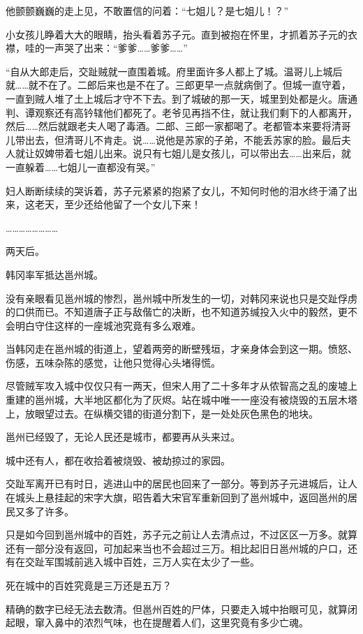 他颤颤巍巍的走上见，不敢置信的问着：“七姐儿？是七姐儿！？”

小女孩儿睁着大大的眼睛，抬头看着苏子元。直到被抱在怀里，才抓着苏子元的衣襟，哇的一声哭了出来：“爹爹……爹爹……”

“自从大郎走后，交趾贼就一直围着城。府里面许多人都上了城。温哥儿上城后就……就不在了。二郎后来也是不在了。三郎更早一点就病倒了。但城一直守着，一直到贼人堆了土上城后才守不下去。到了城破的那一天，城里到处都是火。唐通判、谭观察还有高钤辖他们都死了。老爷见再挡不住，就让我们剩下的人都离开，然后……然后就跟老夫人喝了毒酒。二郎、三郎一家都喝了。老都管本来要将清哥儿带出去，但清哥儿不肯走。说……说他是苏家的子弟，不能丢苏家的脸。最后夫人就让奴婢带着七姐儿出来。说只有七姐儿是女孩儿，可以带出去……出来后，就一直躲着……七姐儿一直都没有哭。”

妇人断断续续的哭诉着，苏子元紧紧的抱紧了女儿，不知何时他的泪水终于涌了出来，这老天，至少还给他留了一个女儿下来！

……………………

两天后。

韩冈率军抵达邕州城。

没有亲眼看见邕州城的惨烈，邕州城中所发生的一切，对韩冈来说也只是交趾俘虏的口供而已。不知道唐子正与敌偕亡的决断，也不知道苏缄投入火中的毅然，更不会明白守住这样的一座城池究竟有多么艰难。

当韩冈走在邕州城的街道上，望着两旁的断壁残垣，才亲身体会到这一期。愤怒、伤感，五味杂陈的感觉，让他只觉得心头堵得慌。

尽管贼军攻入城中仅仅只有一两天，但宋人用了二十多年才从侬智高之乱的废墟上重建的邕州城，大半地区都化为了灰烬。站在城中唯一一座没有被烧毁的五层木塔上，放眼望过去。在纵横交错的街道分割下，是一处处灰色黑色的地块。

邕州已经毁了，无论人民还是城市，都要再从头来过。

城中还有人，都在收拾着被烧毁、被劫掠过的家园。

交趾军离开已有时日，逃进山中的居民也回来了一部分。等到苏子元进城后，让人在城头上悬挂起的宋字大旗，昭告着大宋官军重新回到了邕州城中，返回邕州的居民又多了许多。

只是如今回到邕州城中的百姓，苏子元之前让人去清点过，不过区区一万多。就算还有一部分没有返回，可加起来当也不会超过三万。相比起旧日邕州城的户口，还有在交趾军围城前逃入城中百姓，三万人实在太少了一些。

死在城中的百姓究竟是三万还是五万？

精确的数字已经无法去数清。但邕州百姓的尸体，只要走入城中抬眼可见，就算闭起眼，窜入鼻中的浓烈气味，也在提醒着人们，这里究竟有多少亡魂。

